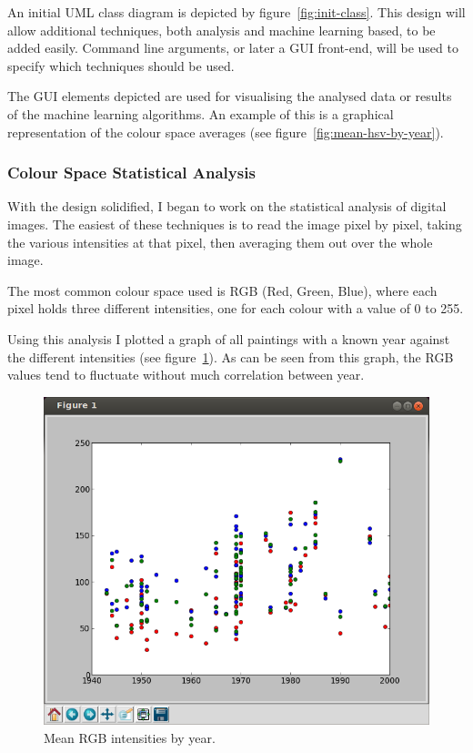 \documentclass[11pt,fleqn,twoside]{article}
\begin{document}
An initial UML class diagram is depicted by figure~\ref{fig:init-class}. This design will allow 
additional techniques, both analysis and machine learning based, to be added easily. Command line
arguments, or later a GUI front-end, will be used to specify which techniques should be used.

The GUI elements depicted are used for visualising the analysed data or results of the machine
learning algorithms. An example of this is a graphical representation of the colour space averages
(see figure~\ref{fig:mean-hsv-by-year}).

\subsubsection{Colour Space Statistical Analysis}
With the design solidified, I began to work on the statistical analysis of digital images. The 
easiest of these techniques is to read the image pixel by pixel, taking the various intensities at
that pixel, then averaging them out over the whole image.

The most common colour space used is RGB (Red, Green, Blue), where each pixel holds three different
intensities, one for each colour with a value of 0 to 255.

Using this analysis I plotted a graph of all paintings with a known year against the different 
intensities (see figure~\ref{fig:mean-rgb-by-year}). As can be seen from this graph, the RGB values
tend to fluctuate without much correlation between year.

\begin{figure}[p]
\includegraphics[scale=0.5]{img/kyffin-rgp-avg.png}
\caption{Mean RGB intensities by year.}
\label{fig:mean-rgb-by-year}
\end{figure}
\end{document}

